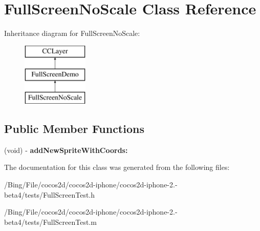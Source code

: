 \hypertarget{interface_full_screen_no_scale}{\section{Full\-Screen\-No\-Scale Class Reference}
\label{interface_full_screen_no_scale}
}
Inheritance diagram for Full\-Screen\-No\-Scale\-:\begin{figure}[H]
\begin{center}
\leavevmode
\includegraphics[height=3.000000cm]{interface_full_screen_no_scale}
\end{center}
\end{figure}
\subsection*{Public Member Functions}
\begin{DoxyCompactItemize}
\item 
\hypertarget{interface_full_screen_no_scale_aa72e7d1f5dacbf75869b8d54efa93e39}{(void) -\/ {\bfseries add\-New\-Sprite\-With\-Coords\-:}}\label{interface_full_screen_no_scale_aa72e7d1f5dacbf75869b8d54efa93e39}

\end{DoxyCompactItemize}


The documentation for this class was generated from the following files\-:\begin{DoxyCompactItemize}
\item 
/\-Bing/\-File/cocos2d/cocos2d-\/iphone/cocos2d-\/iphone-\/2.-\/beta4/tests/Full\-Screen\-Test.\-h\item 
/\-Bing/\-File/cocos2d/cocos2d-\/iphone/cocos2d-\/iphone-\/2.-\/beta4/tests/Full\-Screen\-Test.\-m\end{DoxyCompactItemize}
